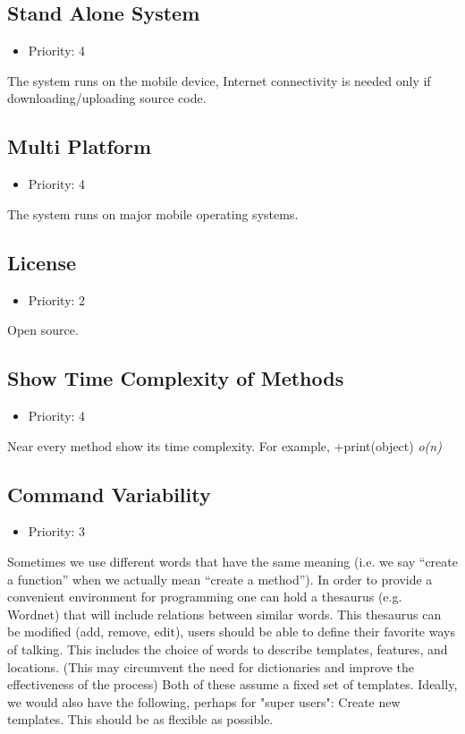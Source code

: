 \subsection{Stand Alone System}
\begin{itemize}
	\item Priority: 4
\end{itemize}
The system runs on the mobile device, Internet connectivity is needed only if downloading/uploading source code.
\subsection{Multi Platform}
\begin{itemize}
	\item Priority: 4
\end{itemize}
The system runs on major mobile operating systems.
\subsection{License}
\begin{itemize}
	\item Priority: 2
\end{itemize}
Open source.
\subsection{Show Time Complexity of Methods}
\begin{itemize}
	\item Priority: 4
\end{itemize}
Near every method show its time complexity. For example, +print(object) \textit{o(n)}
\subsection{Command Variability}
\begin{itemize}
	\item Priority: 3
\end{itemize}
Sometimes we use different words that have the same meaning (i.e. we say “create a function” when we actually mean “create a method”). In order to provide a convenient environment for programming one can hold a thesaurus (e.g. Wordnet) that will include relations between similar words. This thesaurus can be modified (add, remove, edit), users should be able to define their favorite ways of talking.  This includes the choice of words to describe templates, features, and locations.  (This may circumvent the need for dictionaries and improve the effectiveness of the process) Both of these assume a fixed set of templates.  Ideally, we would also have the following, perhaps for "super users": Create new templates. This should be as flexible as possible.
